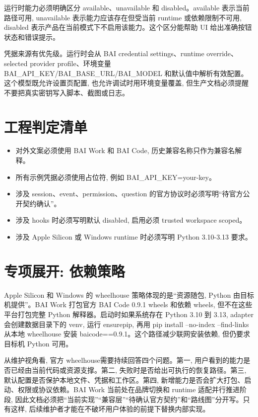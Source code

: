 运行时能力必须明确区分 available、unavailable 和 disabled。available 表示当前路径可用, unavailable 表示能力应该存在但受当前 runtime 或依赖限制不可用, disabled 表示产品在当前模式下不启用该能力。这个区分能帮助 UI 给出准确按钮状态和错误提示。

凭据来源有优先级。运行时会从 BAI credential settings、runtime override、selected provider profile、环境变量 BAI\_API\_KEY/BAI\_BASE\_URL/BAI\_MODEL 和默认值中解析有效配置。这个模型既允许设置页配置, 也允许调试时用环境变量覆盖, 但生产文档必须提醒不要把真实密钥写入脚本、截图或日志。

\section{工程判定清单}
\begin{itemize}
  \item 对外文案必须使用 BAI Work 和 BAI Code, 历史兼容名称只作为兼容名解释。
  \item 所有示例凭据必须使用占位符, 例如 BAI\_API\_KEY=your-key。
  \item 涉及 session、event、permission、question 的官方协议时必须写明“待官方公开契约确认”。
  \item 涉及 hooks 时必须写明默认 disabled, 启用必须 trusted workspace scoped。
  \item 涉及 Apple Silicon 或 Windows runtime 时必须写明 Python 3.10-3.13 要求。
\end{itemize}

\section{专项展开: 依赖策略}
Apple Silicon 和 Windows 的 wheelhouse 策略体现的是“资源随包, Python 由目标机提供”。BAI Work 打包官方 BAI Code 0.9.1 wheels 和依赖 wheels, 但不在这些平台打包完整 Python 解释器。启动时如果系统存在 Python 3.10 到 3.13, adapter 会创建数据目录下的 venv, 运行 ensurepip, 再用 pip install --no-index --find-links 从本地 wheelhouse 安装 baicode==0.9.1。这个路径减少联网安装依赖, 但仍要求目标机 Python 可用。

从维护视角看, 官方 wheelhouse需要持续回答四个问题。第一, 用户看到的能力是否已经由当前代码或资源支撑。第二, 失败时是否给出可执行的恢复路径。第三, 默认配置是否保护本地文件、凭据和工作区。第四, 新增能力是否会扩大打包、启动、权限或协议依赖。BAI Work 当前处在品牌切换和 runtime 适配并行推进阶段, 因此文档必须把“当前实现”“兼容层”“待确认官方契约”和“路线图”分开写。只有这样, 后续维护者才能在不破坏用户体验的前提下替换内部实现。

